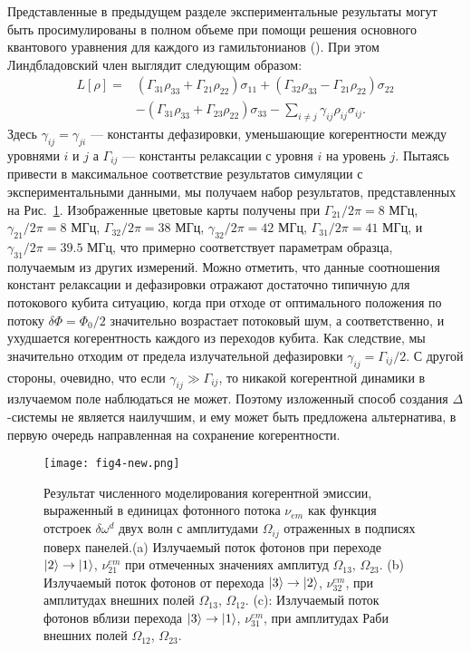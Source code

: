 Представленные в предыдущем разделе экспериментальные результаты могут быть просимулированы в полном объеме при помощи решения основного квантового уравнения для каждого из гамильтонианов (). При этом Линдбладовский член выглядит следующим образом:
\begin{equation}
	\begin{aligned}
		L[\rho]={}&(\Gamma_{31}\rho_{33}+\Gamma_{21}\rho_{22})\sigma_{11}+(\Gamma_{32}\rho_{33}-\Gamma_{21}\rho_{22})\sigma_{22}\\
		&-(\Gamma_{31}\rho_{33}+\Gamma_{23}\rho_{22})\sigma_{33}-\sum_{i\neq j} \gamma_{ij}\rho_{ij}\sigma_{ij}.
	\end{aligned}
\end{equation}
Здесь $\gamma_{ij}=\gamma_{ji}$ --- константы дефазировки, уменьшающие когерентности между уровнями $i$ и $j$ а $\Gamma_{ij}$ --- константы релаксации с уровня $i$ на уровень $j$. Пытаясь привести в максимальное соответствие результатов симуляции с экспериментальными данными, мы получаем набор результатов, представленных на Рис.~\ref{fig:4}. Изображенные цветовые карты получены при $\Gamma_{21}/2\pi=8$ МГц, $\gamma_{21}/2\pi=8$ МГц, $\Gamma_{32}/2\pi=38$ МГц, $\gamma_{32}/2\pi=42$ МГц, $\Gamma_{31}/2\pi=41$ МГц, и $\gamma_{31}/2\pi=39.5$ МГц, что примерно соответствует параметрам образца, получаемым из других измерений. Можно отметить, что данные соотношения констант релаксации и дефазировки отражают достаточно типичную для потокового кубита ситуацию, когда при отходе от оптимального положения по потоку $\delta\Phi=\Phi_0/2$ значительно возрастает потоковый шум, а соответственно, и ухудшается когерентность каждого из переходов кубита. Как следствие, мы значительно отходим от предела излучательной дефазировки $\gamma_{ij}=\Gamma_{ij}/2$. С другой стороны, очевидно, что если $\gamma_{ij} \gg \Gamma_{ij}$, то никакой когерентной динамики в излучаемом поле наблюдаться не может. Поэтому изложенный способ создания $\Delta$-системы не является наилучшим, и ему может быть предложена альтернатива, в первую очередь направленная на сохранение когерентности. 
\begin{figure}[!hbt]
	\centering
	\texttt{[image: fig4-new.png]} 
	\caption[Результат численного моделирования когерентной эмиссии, выраженный в единицах фотонного потока ]{Результат численного моделирования когерентной эмиссии, выраженный в единицах фотонного потока $\nu_{em}$ как функция отстроек $\delta\omega^{d}$ двух волн с амплитудами $\Omega_{ij}$ отраженных в подписях поверх панелей.(a) Излучаемый поток фотонов при переходе $\ket{2}\rightarrow \ket{1}$, $\nu^{em}_{21}$ при отмеченных значениях амплитуд $\Omega_{13}$, $\Omega_{23}$. (b) Излучаемый поток фотонов от перехода $\ket{3}\rightarrow \ket{2}$, $\nu^{em}_{32}$, при амплитудах внешних полей $\Omega_{13}$, $\Omega_{12}$. (c): Излучаемый поток фотонов вблизи перехода $\ket{3}\rightarrow \ket{1}$, $\nu^{em}_{31}$, при амплитудах Раби внешних полей $\Omega_{12}$, $\Omega_{23}$.}
	\label{fig:4}
\end{figure}

